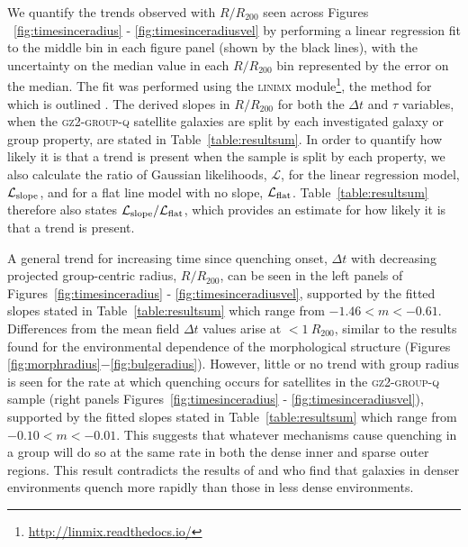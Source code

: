 \documentclass[useAMS,usenatbib]{mn2e}
\def\minor		{\color{minorcol}}
\begin{document}
We quantify the trends observed with $R/R_{200}$ seen across Figures ~\ref{fig:timesinceradius} - \ref{fig:timesinceradiusvel} by performing a linear regression fit to the middle bin in each figure panel (shown by the black lines), with the uncertainty on the median value in each $R/R_{200}$ bin represented by the error on the median. The fit was performed using the \textsc{linimx} module\footnote{\url{http://linmix.readthedocs.io/}}, the method for which is outlined \citealt{kelly07}. The derived slopes in $R/R_{200}$ for both the $\Delta t$ and $\tau$ variables, when the \textsc{gz2-group-q} satellite galaxies are split by each investigated galaxy or group property, are stated in Table~\ref{table:resultsum}. {\minor In order to quantify how likely it is that a trend is present when the sample is split by each property, we also calculate the ratio of Gaussian likelihoods, $\mathcal{L}$, for the linear regression model, $\mathcal{L}_{\rm{slope}}$, and for a flat line model with no slope, $\mathcal{L}_{\rm{flat}}$. Table~\ref{table:resultsum} therefore also states $\mathcal{L}_{\rm{slope}}/\mathcal{L}_{\rm{flat}}$, which provides an estimate for how likely it is that a trend is present.}


A general trend for increasing time since quenching onset, $\Delta t$ with decreasing projected group-centric radius, $R/R_{200}$, can be seen in the left panels of Figures~\ref{fig:timesinceradius} - \ref{fig:timesinceradiusvel}, supported by the fitted slopes stated in Table~\ref{table:resultsum} which range from $-1.46 < m < -0.61$. Differences from the mean field $\Delta t$ values arise at $<1~R_{200}$, similar to the results found for the environmental dependence of the morphological structure (Figures \ref{fig:morphradius}$-$\ref{fig:bulgeradius}). However, little or no trend with group radius is seen for the rate at which quenching occurs for satellites in the \textsc{gz2-group-q} sample (right panels Figures~\ref{fig:timesinceradius} - \ref{fig:timesinceradiusvel}), supported by the fitted slopes stated in Table~\ref{table:resultsum} which range from $-0.10 < m < -0.01$. This suggests that whatever mechanisms cause quenching in a group will do so at the same rate in both the dense inner and sparse outer regions. {\minor This result contradicts the results of \citet{rettura10, rettura11, ferre14} and \cite{darvish16} who find that galaxies in denser environments quench more rapidly than those in less dense environments.}
\end{document}
